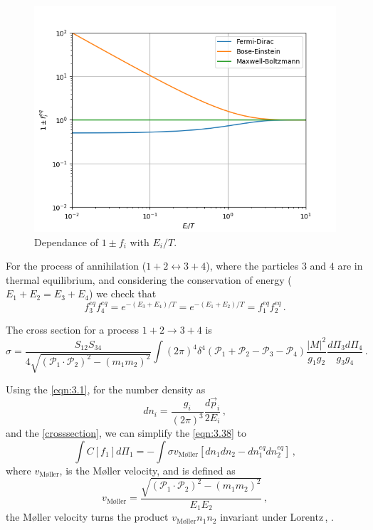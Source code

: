 \begin{figure}[H]
	\centering
	\includegraphics[width=0.7\linewidth]{graphs/1+-fi}
	\caption{Dependance of $1\pm f_i$ with $E_i/T$.}
	\label{fig:1-fi}
\end{figure}

For the process of annihilation ($1+2 \leftrightarrow 3+4$), where the particles $3$ and $4$ are in thermal equilibrium, and considering the conservation of energy ($E_1+E_2=E_3+E_4$) we check that
\begin{equation}
	f_3^{eq}f_4^{eq}=e^{-(E_3+E_4)/T}=e^{-(E_1+E_2)/T}=f_1^{eq}f_2^{eq}\,.
\end{equation}

The cross section for a process $1+2\rightarrow3+4$ is 
\begin{equation}
	\label{crosssection}
	\sigma=\frac{S_{12}S_{34}}{4\sqrt{(\mathcal{P}_1\cdot\mathcal{P}_2)^2-(m_1m_2)^2}}\int (2\pi)^4\delta^4(\mathcal{P}_1+\mathcal{P}_2-\mathcal{P}_3-\mathcal{P}_4)\frac{|M|^2}{g_1g_2}\frac{d\Pi_3d\Pi_4}{g_3g_4}\,.
\end{equation}

Using the \autoref{eqn:3.1}, for the number density as
\begin{equation}
	\label{dni}
	dn_i=\frac{g_i}{(2\pi)^3}\frac{d\vec{p}_i}{2E_i}\,,
\end{equation}
and the \autoref{crosssection}, we can simplify the \autoref{eqn:3.38} to
\begin{equation}
	\label{3.45}
	\int C[f_1] d\Pi_1 = -\int \sigma v_{\textrm{M{\o}ller}}\left[dn_1dn_2-dn_1^{eq}dn_2^{eq}\right]\,,
\end{equation}
where $v_{\textrm{M{\o}ller}}$, is the M{\o}ller velocity, and is defined as
\begin{equation}
	\label{vmoller}
	v_{\textrm{M{\o}ller}}=\frac{\sqrt{(\mathcal{P}_1\cdot\mathcal{P}_2)^2-(m_1m_2)^2}}{E_1E_2}\,,
\end{equation}
the M{\o}ller velocity turns the product $v_{\textrm{M{\o}ller}}n_1n_2$ invariant under Lorentz\,, \cite{GONDOLO}.

